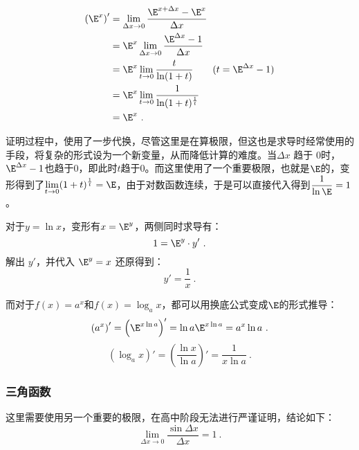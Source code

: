 \begin{equation}
\begin{split}
\left(\E^x\right)' &= \lim_{\Delta x \to 0}\frac{\E^{x+\Delta x}-\E^x}{\Delta x} \\
&= \E^x\lim_{\Delta x \to 0}\frac{\E^{\Delta x}-1}{\Delta x} \\
&= \E^x\lim_{t \to 0}\frac{t}{\ln(1+t)}\qquad(t=\E^{\Delta x}-1)\\
&= \E^x\lim_{t \to 0}\frac{1}{\ln(1+t)^{1\over t}}\\
&= \E^x~.
\end{split}
\end{equation}

证明过程中，使用了一步代换，尽管这里是在算极限，但这也是求导时经常使用的手段，将复杂的形式设为一个新变量，从而降低计算的难度。当$\Delta x$ 趋于 $0$时，$\E^{\Delta x}-1$也趋于$0$，即此时$t$趋于$0$。而这里使用了一个重要极限，也就是$\E$的，变形得到了$\displaystyle\lim_{t \to 0}(1+t)^{1\over t}=\E$，由于对数函数连续，于是可以直接代入得到$\displaystyle\frac{1}{\ln\E}=1$。

对于$y=\ln x$，变形有$x=\E^y$，两侧同时求导有：
\begin{equation}
1=\E^y\cdot y'~.
\end{equation}
解出 $y'$，并代入 $\displaystyle \E^y=x$ 还原得到：
\begin{equation}
y'=\frac{1}{x}~.
\end{equation}

而对于$f(x)=a^x$和$f(x)=\log_a x$，都可以用换底公式变成$\E$的形式推导：
\begin{equation}
\left(a^x\right)'=\left(\E^{x\ln a}\right)'=\ln a\E^{x\ln a}=a^x\ln a~.
\end{equation}
\begin{equation}
\left(\log_a x\right)'=\left(\frac{\ln x}{\ln a}\right)'=\frac{1}{x\ln a}~.
\end{equation}

\subsubsection{三角函数}


这里需要使用另一个重要的极限，在高中阶段无法进行严谨证明，结论如下：
\begin{equation}\label{eq_HsDerB_3}
\displaystyle\lim_{\Delta x \to 0}\frac{\sin\Delta x} {\Delta x}=1~.
\end{equation}

